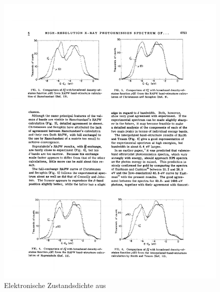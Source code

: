 \documentclass[bachelor,       %
               twoside,        %
               BCOR10mm,       %
               english,ngerman, %
               ]{GAUBM}
\begin{document}
\begin{figure}[h!]
	\centering
	\includegraphics{GoldZustandsdichte}
	\caption{Elektronische Zustandsdichte aus \cite{gold_zustandsdichte}}
	\label{fig:gold_zustandsdichte}
\end{figure}








\appendix
\end{document}

